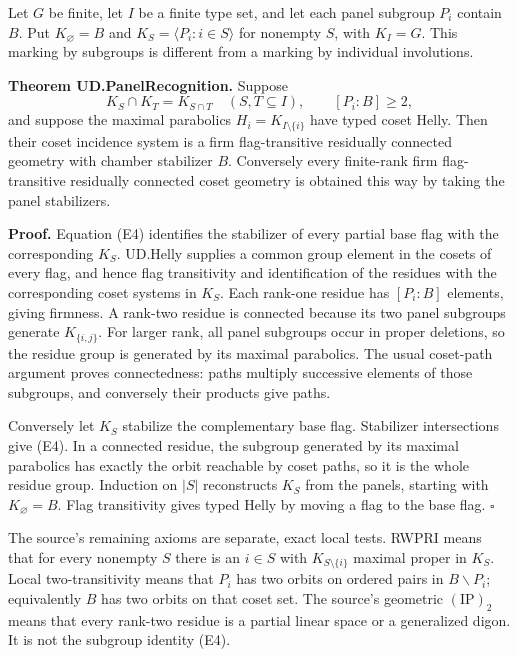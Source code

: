 Let \(G\) be finite, let \(I\) be a finite type set, and let each panel
subgroup \(P_i\) contain \(B\). Put \(K_\varnothing=B\) and
\(K_S=\langle P_i:i\in S\rangle\) for nonempty \(S\), with \(K_I=G\).
This marking by subgroups is different from a marking by individual
involutions.

\textbf{Theorem UD.PanelRecognition.} Suppose \[
K_S\cap K_T=K_{S\cap T}\quad(S,T\subseteq I),\qquad [P_i:B]\ge2,
\tag{E4}
\] and suppose the maximal parabolics \(H_i=K_{I\setminus\{i\}}\) have
typed coset Helly. Then their coset incidence system is a firm
flag-transitive residually connected geometry with chamber stabilizer
\(B\). Conversely every finite-rank firm flag-transitive residually
connected coset geometry is obtained this way by taking the panel
stabilizers.

\textbf{Proof.} Equation (E4) identifies the stabilizer of every partial
base flag with the corresponding \(K_S\). UD.Helly supplies a common
group element in the cosets of every flag, and hence flag transitivity
and identification of the residues with the corresponding coset systems
in \(K_S\). Each rank-one residue has \([P_i:B]\) elements, giving
firmness. A rank-two residue is connected because its two panel
subgroups generate \(K_{\{i,j\}}\). For larger rank, all panel subgroups
occur in proper deletions, so the residue group is generated by its
maximal parabolics. The usual coset-path argument proves connectedness:
paths multiply successive elements of those subgroups, and conversely
their products give paths.

Conversely let \(K_S\) stabilize the complementary base flag. Stabilizer
intersections give (E4). In a connected residue, the subgroup generated
by its maximal parabolics has exactly the orbit reachable by coset
paths, so it is the whole residue group. Induction on \(|S|\)
reconstructs \(K_S\) from the panels, starting with \(K_\varnothing=B\).
Flag transitivity gives typed Helly by moving a flag to the base flag.
\(\square\)

The source's remaining axioms are separate, exact local tests. RWPRI
means that for every nonempty \(S\) there is an \(i\in S\) with
\(K_{S\setminus\{i\}}\) maximal proper in \(K_S\). Local
two-transitivity means that \(P_i\) has two orbits on ordered pairs in
\(B\backslash P_i\); equivalently \(B\) has two orbits on that coset
set. The source's geometric \((\mathrm{IP})_2\) means that every
rank-two residue is a partial linear space or a generalized digon. It is
not the subgroup identity (E4).

